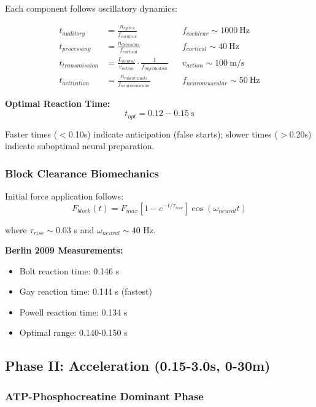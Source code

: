 Each component follows oscillatory dynamics:

\begin{align}
t_{auditory} &= \frac{n_{cycles}}{f_{cochlear}} && f_{cochlear} \sim 1000~\text{Hz} \\
t_{processing} &= \frac{n_{decisions}}{f_{cortical}} && f_{cortical} \sim 40~\text{Hz} \\
t_{transmission} &= \frac{L_{neural}}{v_{action}} \cdot \frac{1}{f_{myelination}} && v_{action} \sim 100~\text{m/s} \\
t_{activation} &= \frac{n_{motor\_units}}{f_{neuromuscular}} && f_{neuromuscular} \sim 50~\text{Hz}
\end{align}

\textbf{Optimal Reaction Time:}
\begin{equation}
t_{opt} = 0.12-0.15~\text{s}
\label{eq:optimal_reaction}
\end{equation}

Faster times ($<$0.10s) indicate anticipation (false starts); slower times ($>$0.20s) indicate suboptimal neural preparation.

\subsubsection{Block Clearance Biomechanics}

Initial force application follows:
\begin{equation}
F_{block}(t) = F_{max} \left[1 - e^{-t/\tau_{rise}}\right] \cos(\omega_{neural} t)
\label{eq:block_force}
\end{equation}

where $\tau_{rise} \sim 0.03$ s and $\omega_{neural} \sim 40$ Hz.

\textbf{Berlin 2009 Measurements:}
\begin{itemize}
\item Bolt reaction time: 0.146 s
\item Gay reaction time: 0.144 s (fastest)
\item Powell reaction time: 0.134 s
\item Optimal range: 0.140-0.150 s
\end{itemize}

\subsection{Phase II: Acceleration (0.15-3.0s, 0-30m)}

\subsubsection{ATP-Phosphocreatine Dominant Phase}

